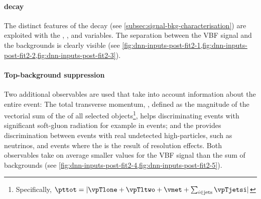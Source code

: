 \paragraph{\HWW decay}
The distinct features of the \HWW decay (see \cref{subsec:signal-bkg-characterisation}) are exploited with the \dphill, \mll, and \mT variables.
The separation between the VBF signal and the backgrounds is clearly visible (see \cref{fig:dnn-inputs-post-fit2-1,fig:dnn-inputs-post-fit2-2,fig:dnn-inputs-post-fit2-3}).

\paragraph{Top-background suppression}
Two additional observables are used that take into account information about the entire event:
The total transverse momentum, \pttot, defined as the magnitude of the vectorial sum of the \pT of all selected objects\footnote{Specifically, $\pttot = | \vpTlone + \vpTltwo + \vmet + \sum_{i \in \text{jets}} \vpTjetsi |$}, helps discriminating events with significant soft-gluon radiation for example in \ttbar events; and the \METSig provides discrimination between events with real undetected high-\pT particles, such as neutrinos, and events where the \MET is the result of resolution effects. Both observables take on average smaller values for the VBF signal than the sum of backgrounds (see \cref{fig:dnn-inputs-post-fit2-4,fig:dnn-inputs-post-fit2-5}).

